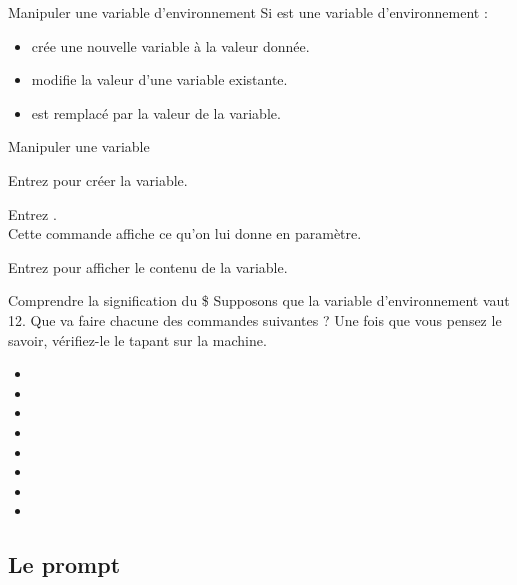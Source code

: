 \documentclass[a4paper,11pt]{style-esi/td}
\begin{document}
		\begin{theorie}{Manipuler une variable d'environnement}
			Si  est une variable d'environnement :
			\begin{itemize}
			\item {} crée une nouvelle variable à la valeur donnée.
			\item {} modifie la valeur d'une variable existante.
			\item {} est remplacé par la valeur de la variable.
			\end{itemize}
		\end{theorie}

		\begin{Experience}{Manipuler une variable}
			\begin{steps}
			\item Entrez  pour créer la variable.
			\item Entrez .
				\\Cette commande affiche ce qu'on lui donne en paramètre.
			\item Entrez  pour afficher le contenu de la variable.
			\end{steps}
		\end{Experience}

		\begin{Exercice}{Comprendre la signification du \$}
			Supposons que la variable d'environnement  vaut 12.
			Que va faire chacune des commandes suivantes ?
			Une fois que vous pensez le savoir, 
			vérifiez-le le tapant sur la machine.
			\begin{itemize}
			\item {}
			\item {}
			\item {} 
			\item {} 
			\item {} 
			\item {} 
			\item {} 
			\item {} 
			\end{itemize}
		\end{Exercice}

	\subsection{Le prompt}
\end{document}
